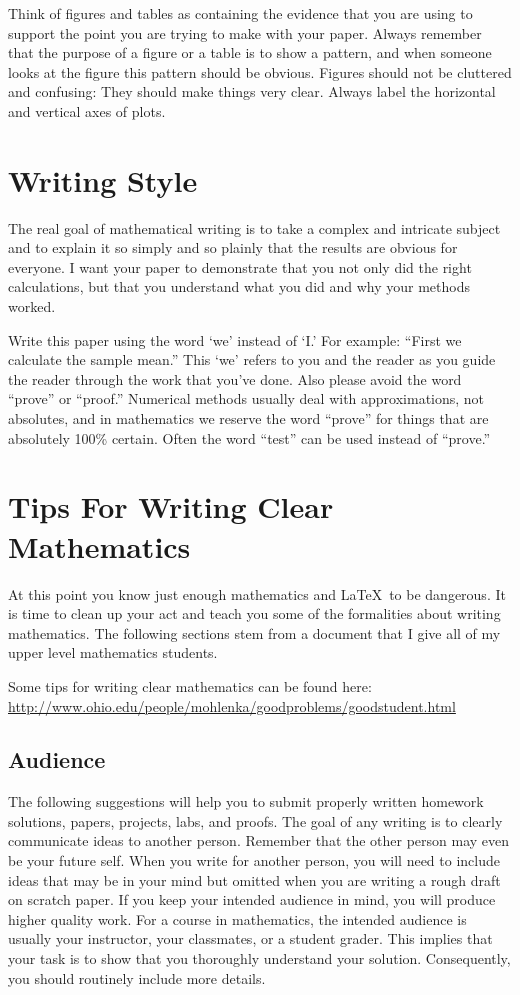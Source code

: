 Think of figures and tables as containing the evidence that you are using to support the
point you are trying to make with your paper. Always remember that the purpose of a figure
or a table is to show a pattern, and when someone looks at the figure this pattern should
be obvious. Figures should not be cluttered and confusing: They should make things very
clear. Always label the horizontal and vertical axes of plots.

\section{Writing Style}
The real goal of mathematical writing is to take a complex and intricate subject and to
explain it so simply and so plainly that the results are obvious for everyone. I want your
paper to demonstrate that you not only did the right calculations, but that you understand
what you did and why your methods worked.

Write this paper using the word `we' instead of `I.' For example: ``First we calculate the
sample mean.'' This `we' refers to you and the reader as you guide the reader through the
work that you've done. Also please avoid the word ``prove'' or ``proof.'' Numerical methods
usually deal with approximations, not absolutes, and in mathematics we reserve the word
``prove'' for things that are absolutely 100\% certain. Often the word ``test'' can be used
instead of ``prove.''



\section{Tips For Writing Clear Mathematics}
At this point you know just enough mathematics and \LaTeX\ to be dangerous.  It is time to
clean up your act and teach you some of the formalities about writing mathematics.  The
following sections stem from a document that I give all of my upper level mathematics
students.  

Some tips for writing clear mathematics can be found here: \\
\href{http://www.ohio.edu/people/mohlenka/goodproblems/goodstudent.html}{http://www.ohio.edu/people/mohlenka/goodproblems/goodstudent.html}


\subsection{Audience}
The following suggestions will help you to submit properly written homework solutions,
papers, projects, labs, and proofs. The goal of any writing is to clearly communicate
ideas to another person. Remember that the other person may even be your future self. When
you write for another person, you will need to include ideas that may be in your mind but
omitted when you are writing a rough draft on scratch paper. If you keep your intended
audience in mind, you will produce higher quality work. For a course in mathematics, the
intended audience is usually your instructor, your classmates, or a student grader. This
implies that your task is to show that you thoroughly understand your solution.
Consequently, you should routinely include more details.

